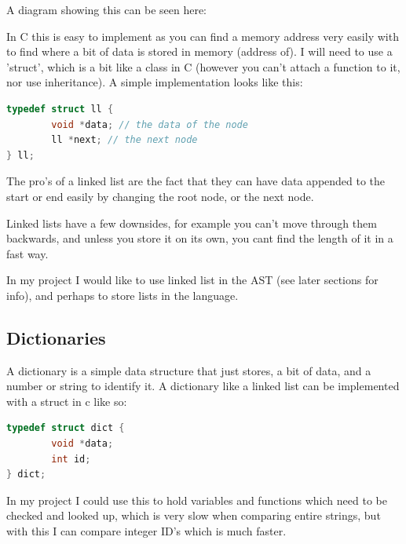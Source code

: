 \documentclass[a4paper,12pt]{article}
\begin{document}
{A diagram showing this can be seen here:


In C this is easy to implement as you can find a memory address very easily with to 
find where a bit of data is stored in memory (address of). I will need to use a 'struct', 
which is a bit like a class in C (however you can't attach a function to it, nor use 
inheritance). A simple implementation looks like this:

\begin{lstlisting}[language=C++, caption=Linked list example]
typedef struct ll {
        void *data; // the data of the node
        ll *next; // the next node
} ll;
\end{lstlisting}

The pro's of a linked list are the fact that they can have data appended to the start or 
end easily by changing the root node, or the next node.

Linked lists have a few downsides, for example you can't move through them backwards, 
and unless you store it on its own, you cant find the length of it in a fast way.

In my project I would like to use linked list in the AST (see later sections for info), 
and perhaps to store lists in the language.

\subsection{Dictionaries}
A dictionary is a simple data structure that just stores, a bit of data, and a number or 
string to identify it.
A dictionary like a linked list can be implemented with a struct in c like so:
\begin{lstlisting}[language=C++, caption=Dictionary example]
typedef struct dict {
        void *data;
        int id;
} dict;
\end{lstlisting}

In my project I could use this to hold variables and functions which need to be 
checked and looked up, which is very slow when comparing entire strings, but with this
I can compare integer ID's which is much faster.

}
\end{document}
